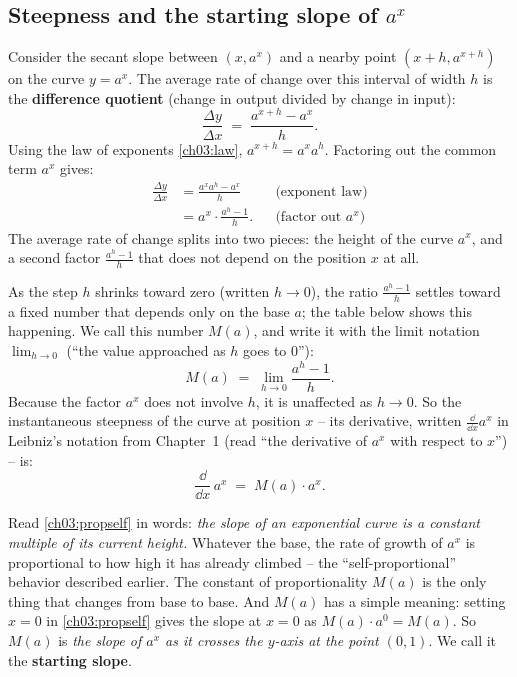 \subsection{Steepness and the starting slope of $a^x$}

Consider the secant slope between $(x, a^x)$ and a nearby point $(x+h, a^{x+h})$ on the curve $y=a^x$. The average rate of change over this interval of width $h$ is the \textbf{difference quotient} (change in output divided by change in input):
\[
\frac{\Delta y}{\Delta x} \;=\; \frac{a^{x+h}-a^{x}}{h}.
\]
Using the law of exponents \eqref{ch03:law}, $a^{x+h} = a^x a^h$. Factoring out the common term $a^x$ gives:
\begin{align*}
\frac{\Delta y}{\Delta x}
  &= \frac{a^{x}a^{h}-a^{x}}{h} && \text{(exponent law)}\\
  &= a^{x}\cdot\frac{a^{h}-1}{h}. && \text{(factor out } a^x\text{)}
\end{align*}
The average rate of change splits into two pieces: the height of the curve $a^x$, and a second factor $\frac{a^h-1}{h}$ that does not depend on the position $x$ at all.

As the step $h$ shrinks toward zero (written $h\to 0$), the ratio $\frac{a^h-1}{h}$ settles toward a fixed number that depends only on the base $a$; the table below shows this happening. We call this number $M(a)$, and write it with the limit notation $\lim_{h\to 0}$ (``the value approached as $h$ goes to $0$''):
\[
M(a) \;=\; \lim_{h\to 0}\frac{a^{h}-1}{h}.
\]
Because the factor $a^x$ does not involve $h$, it is unaffected as $h\to 0$. So the instantaneous steepness of the curve at position $x$ -- its derivative, written $\frac{\dd}{\dd x} a^x$ in Leibniz's notation from Chapter~1 (read ``the derivative of $a^x$ with respect to $x$'') -- is:
\begin{equation}
\frac{\dd}{\dd x}\,a^{x} \;=\; M(a)\cdot a^{x}. \label{ch03:propself}
\end{equation}

\begin{intuitionbox}
Read \eqref{ch03:propself} in words: \emph{the slope of an exponential curve is a constant multiple of its current height.} Whatever the base, the rate of growth of $a^x$ is proportional to how high it has already climbed -- the ``self-proportional'' behavior described earlier. The constant of proportionality $M(a)$ is the only thing that changes from base to base. And $M(a)$ has a simple meaning: setting $x=0$ in \eqref{ch03:propself} gives the slope at $x=0$ as $M(a)\cdot a^0 = M(a)$. So $M(a)$ is \emph{the slope of $a^x$ as it crosses the $y$-axis at the point $(0,1)$}. We call it the \textbf{starting slope}.
\end{intuitionbox}


